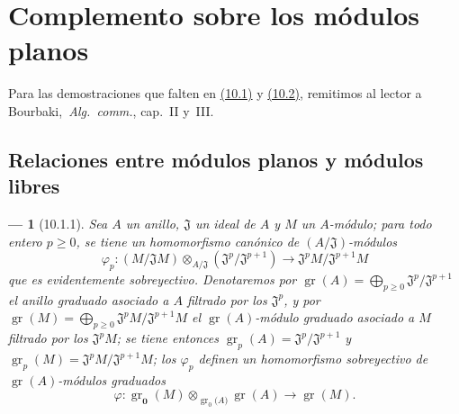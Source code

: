 \documentclass[10pt,oneside,openany]{book}
\theoremstyle{egaenv}\newtheorem*{env}{---}
\theoremstyle{egastatement}
\theoremstyle{egadescription}
\renewcommand{\geq}{\geqslant}
\begin{document}


\section{Complemento sobre los módulos planos}
\label{section:0.10}
\label{section:0.10-fr}

Para las demostraciones que falten en \hyperref[subsection:0.10.1]{(10.1)} y \hyperref[subsection:0.10.2]{(10.2)}, remitimos al lector a Bourbaki,~\emph{Alg.~comm.}, cap.~II y~III.

\subsection{Relaciones entre módulos planos y módulos libres}
\label{subsection:0.10.1}
\label{subsection:0.10.1-fr}

\begin{env}[10.1.1]
\label{0.10.1.1}
\label{0.10.1.1-fr}
Sea $A$ un anillo, $\mathfrak{J}$ un ideal de $A$ y $M$ un $A$-módulo;
para todo entero $p\geq0$, se tiene un homomorfismo canónico de $(A/\mathfrak{J})$-módulos
\[
\label{0.10.1.1.1-fr}
  \varphi_p:(M/\mathfrak{J}M)\otimes_{A/\mathfrak{J}}
  (\mathfrak{J}^p/\mathfrak{J}^{p+1})
  \longrightarrow \mathfrak{J}^pM/\mathfrak{J}^{p+1}M
  \tag{10.1.1.1}
\]
que es evidentemente \emph{sobreyectivo}.
Denotaremos por $\operatorname{gr}(A)=\bigoplus_{p\geq0}\mathfrak{J}^p/\mathfrak{J}^{p+1}$ el anillo graduado asociado a $A$ filtrado por los $\mathfrak{J}^p$, y por $\operatorname{gr}(M)=\bigoplus_{p\geq0}\mathfrak{J}^pM/\mathfrak{J}^{p+1}M$ el $\operatorname{gr}(A)$-módulo graduado asociado a $M$ filtrado por los $\mathfrak{J}^pM$;
se tiene entonces $\operatorname{gr}_p(A)=\mathfrak{J}^p/\mathfrak{J}^{p+1}$ y $\operatorname{gr}_p(M)=\mathfrak{J}^pM/\mathfrak{J}^{p+1}M$;
los $\varphi_p$ definen un homomorfismo \emph{sobreyectivo} de $\operatorname{gr}(A)$-módulos graduados
\[
\label{0.10.1.1.2-fr}
  \varphi:\operatorname{gr}_{\mathbf{0}}(M)\otimes_{\operatorname{gr}_0(A\boldsymbol{)}}
  \operatorname{gr}(A)\longrightarrow\operatorname{gr}(M).
  \tag{10.1.1.2}
\]
\end{env}
\end{document}
